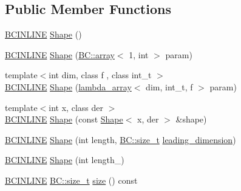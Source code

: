 \subsection*{Public Member Functions}
\begin{DoxyCompactItemize}
\item 
\hyperlink{BlackCat__Common_8h_a6699e8b0449da5c0fafb878e59c1d4b1}{B\+C\+I\+N\+L\+I\+NE} \hyperlink{structBC_1_1tensors_1_1exprs_1_1Shape_3_011_01_4_a8754f5a67bb145a904127f1533d3f998}{Shape} ()
\item 
\hyperlink{BlackCat__Common_8h_a6699e8b0449da5c0fafb878e59c1d4b1}{B\+C\+I\+N\+L\+I\+NE} \hyperlink{structBC_1_1tensors_1_1exprs_1_1Shape_3_011_01_4_a74af37ff344af71f8781dce067157e32}{Shape} (\hyperlink{structBC_1_1array}{B\+C\+::array}$<$ 1, int $>$ param)
\item 
{\footnotesize template$<$int dim, class f , class int\+\_\+t $>$ }\\\hyperlink{BlackCat__Common_8h_a6699e8b0449da5c0fafb878e59c1d4b1}{B\+C\+I\+N\+L\+I\+NE} \hyperlink{structBC_1_1tensors_1_1exprs_1_1Shape_3_011_01_4_a15427bba20afaa21e4b2df05d93d8154}{Shape} (\hyperlink{structBC_1_1lambda__array}{lambda\+\_\+array}$<$ dim, int\+\_\+t, f $>$ param)
\item 
{\footnotesize template$<$int x, class der $>$ }\\\hyperlink{BlackCat__Common_8h_a6699e8b0449da5c0fafb878e59c1d4b1}{B\+C\+I\+N\+L\+I\+NE} \hyperlink{structBC_1_1tensors_1_1exprs_1_1Shape_3_011_01_4_a930b96ebadaff7e6675888de5ae2155b}{Shape} (const \hyperlink{classBC_1_1tensors_1_1exprs_1_1Shape}{Shape}$<$ x, der $>$ \&shape)
\item 
\hyperlink{BlackCat__Common_8h_a6699e8b0449da5c0fafb878e59c1d4b1}{B\+C\+I\+N\+L\+I\+NE} \hyperlink{structBC_1_1tensors_1_1exprs_1_1Shape_3_011_01_4_a6b9b7b686337de9c7cadf6f55f8a2175}{Shape} (int length, \hyperlink{namespaceBC_a6007cbc4eeec401a037b558910a56173}{B\+C\+::size\+\_\+t} \hyperlink{structBC_1_1tensors_1_1exprs_1_1Shape_3_011_01_4_a227969dd695c47b69f092e19a4e1b0c3}{leading\+\_\+dimension})
\item 
\hyperlink{BlackCat__Common_8h_a6699e8b0449da5c0fafb878e59c1d4b1}{B\+C\+I\+N\+L\+I\+NE} \hyperlink{structBC_1_1tensors_1_1exprs_1_1Shape_3_011_01_4_acc65ec586098d7d6b5edc6405665bed3}{Shape} (int length\+\_\+)
\item 
\hyperlink{BlackCat__Common_8h_a6699e8b0449da5c0fafb878e59c1d4b1}{B\+C\+I\+N\+L\+I\+NE} \hyperlink{namespaceBC_a6007cbc4eeec401a037b558910a56173}{B\+C\+::size\+\_\+t} \hyperlink{structBC_1_1tensors_1_1exprs_1_1Shape_3_011_01_4_a96195c0367ed17fe102390c5a409bfd5}{size} () const 

\end{DoxyCompactItemize}
